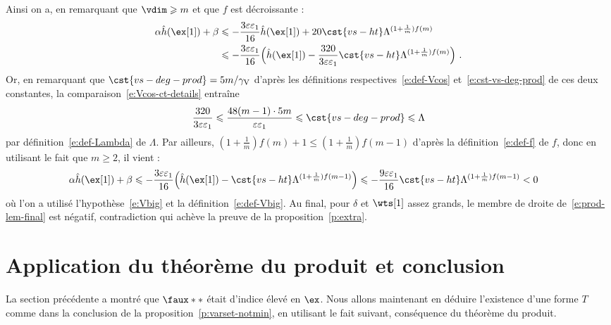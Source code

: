 Ainsi on a, en remarquant que \( \vdim \ge m \) et que \( f \) est
décroissante :
\begin{align} \label{e:Vbig-ct-extra}
  \alpha \hautn{\ex[1]} + \beta
  & \le
  - \frac{3\eps \epsi}{16} \hautn{\ex[1]}
  + 20 \cst{vs-ht} \Lambda^{(1 + \frac1m) f(m)}
  \\ & \le
  - \frac{3\eps \epsi}{16} \Bigl(
    \hautn{\ex[1]}
    - \frac{320}{3\eps \epsi}
    \cst{vs-ht} \Lambda^{(1 + \frac1m) f(m)}
  \Bigr)
  \pmm.
\end{align}
Or, en remarquant que \( \cst{vs-deg-prod} = 5 m / \Vcos \) d'après les
définitions respectives~\eqref{e:def-Vcos} et~\eqref{e:cst-vs-deg-prod} de ces
deux constantes, la comparaison~\eqref{e:Vcos-ct-details} entraîne
\begin{equation}
  \frac{320}{3\eps \epsi}
  \le
  \frac{ 48(m-1) \cdot 5m }{ \eps\epsi }
  \le
  \cst{vs-deg-prod}
  \le
  \Lambda
\end{equation}
par définition~\eqref{e:def-Lambda} de \( \Lambda \). Par ailleurs,
\( (1 + \frac1m) f(m) + 1 \le (1 + \frac1m) f(m-1) \)
d'après la définition~\eqref{e:def-f} de \( f \), donc en utilisant le fait
que \( m \ge 2 \), il vient :
\begin{align}
  \alpha \hautn{\ex[1]} + \beta
  & \le
  - \frac{3\eps \epsi}{16} \Bigl(
    \hautn{\ex[1]}
    - \cst{vs-ht} \Lambda^{(1 + \frac1m) f(m-1)}
  \Bigr)
  \le
  - \frac{9\eps \epsi}{16}
  \cst{vs-ht} \Lambda^{(1 + \frac1m) f(m-1)}
  <
  0
\end{align}
où l'on a utilisé l'hypothèse~\eqref{e:Vbig} et la
définition~\eqref{e:def-Vbig}. Au final, pour \( \delta \) et \( \wts[1] \)
assez grands, le membre de droite de~\eqref{e:prod-lem-final} est négatif,
contradiction qui achève la preuve de la proposition~\vref{p:extra}.



\section{Application du théorème du produit et conclusion}
\label{sec:thm-prod}

La section précédente a montré que \( \faux** \) était d'indice
élevé en \( \ex \). Nous allons maintenant en déduire l'existence d'une forme
\( T \) comme dans la conclusion de la proposition~\vref{p:varset-notmin}, en
utilisant le fait suivant, conséquence du théorème du produit.

